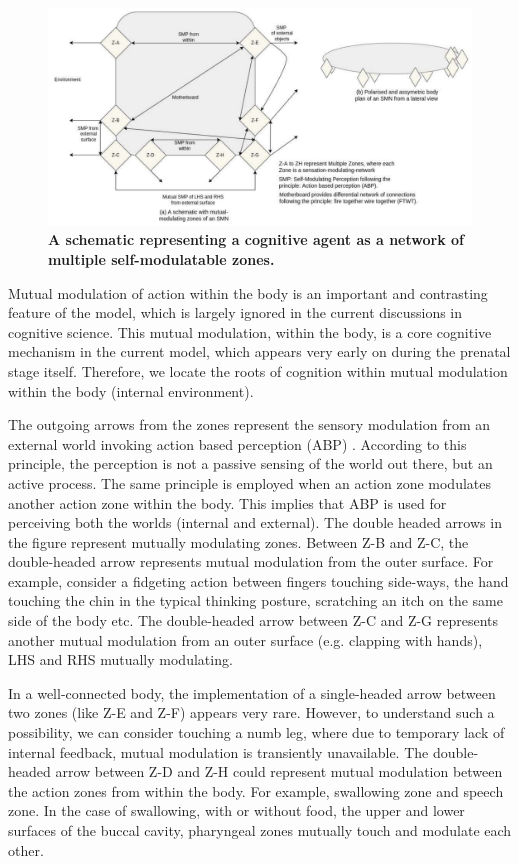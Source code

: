 \begin{figure}[ht] 
\includegraphics[width=\textwidth]{graphics/self-modulating-perception.pdf}
\caption{\textbf{A schematic representing a cognitive agent as a network of multiple self-modulatable zones.}}
\label{smn}
\end{figure}

Mutual modulation of action within the body is an important and contrasting feature of the model, which is largely ignored in the current discussions in cognitive science. This mutual modulation, within the body, is a core cognitive mechanism in the current model, which appears very early on during the prenatal stage itself. Therefore, we locate the roots of cognition within mutual modulation within the body (internal environment).

The outgoing arrows from the zones represent the sensory modulation from an external world invoking action based perception (ABP) \cite{noe_action_2004}. According to this principle, the perception is not a passive sensing of the world out there, but an active process. The same principle is employed when an action zone modulates another action zone within the body. This implies that ABP is used for perceiving both the worlds (internal and external). The double headed arrows in the figure represent mutually modulating zones. Between Z-B and Z-C, the double-headed arrow represents mutual modulation from the outer surface. For example, consider a fidgeting action between fingers touching side-ways, the hand touching the chin in the typical thinking posture, scratching an itch on the same side of the body etc. The double-headed arrow between Z-C and Z-G represents another mutual modulation from an outer surface (e.g. clapping with hands), LHS and RHS mutually modulating.

In a well-connected body, the implementation of a single-headed arrow between two zones (like Z-E and Z-F) appears very rare. However, to understand such a possibility, we can consider touching a numb leg, where due to temporary lack of internal feedback, mutual modulation is transiently unavailable. The double-headed arrow between Z-D and Z-H could represent mutual modulation between the action zones from within the body. For example, swallowing zone and speech zone. In the case of swallowing, with or without food, the upper and lower surfaces of the buccal cavity, pharyngeal zones mutually touch and modulate each other.

